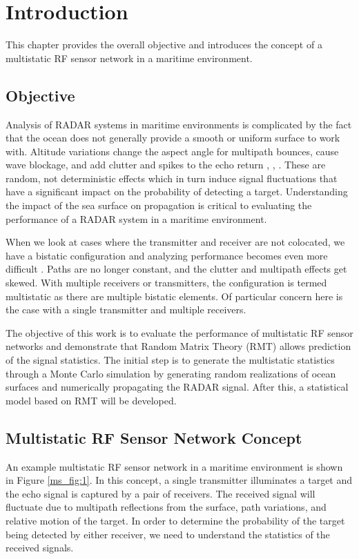 \renewcommand{\baselinestretch}{2} \small\normalsize
\chapter{Introduction}
This chapter provides the overall objective and introduces the concept of a multistatic RF sensor network in a maritime environment.

\section{Objective}
Analysis of RADAR systems in maritime environments is complicated by the fact that the ocean does not generally provide a smooth or uniform surface to work with. Altitude variations change the aspect angle for multipath bounces, cause wave blockage, and add clutter and spikes to the echo return \cite{skolnik_handbook}, \cite{blake_radar}, \cite{nathanson_radar}. These are random, not deterministic effects which in turn induce signal fluctuations that have a significant impact on the probability of detecting a target. Understanding the impact of the sea surface on propagation is critical to evaluating the performance of a RADAR system in a maritime environment.

When we look at cases where the transmitter and receiver are not colocated, we have a bistatic configuration and analyzing performance becomes even more difficult \cite{willis_bistatic}. Paths are no longer constant, and the clutter and multipath effects get skewed. With multiple receivers or transmitters, the configuration is termed multistatic as there are multiple bistatic elements. Of particular concern here is the case with a single transmitter and multiple receivers.

The objective of this work is to evaluate the performance of multistatic RF sensor networks and demonstrate that Random Matrix Theory (RMT) allows prediction of the signal statistics. The initial step is to generate the multistatic statistics through a Monte Carlo simulation by generating random realizations of ocean surfaces and numerically propagating the RADAR signal. After this, a statistical model based on RMT will be developed.

\section{Multistatic RF Sensor Network Concept}
An example multistatic RF sensor network in a maritime environment is shown in Figure \ref{ms_fig:1}. In this concept, a single transmitter illuminates a target and the echo signal is captured by a pair of receivers. The received signal will fluctuate due to multipath reflections from the surface, path variations, and relative motion of the target. In order to determine the probability of the target being detected by either receiver, we need to understand the statistics of the received signals.

